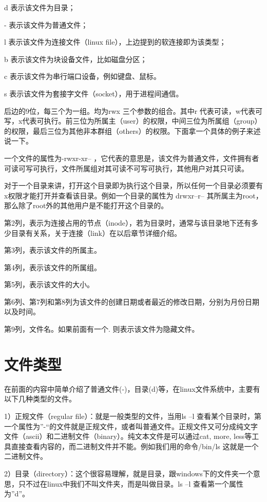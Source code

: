 d 表示该文件为目录；

- 表示该文件为普通文件；

l 表示该文件为连接文件（linux file），上边提到的软连接即为该类型；

b 表示该文件为块设备文件，比如磁盘分区；

c 表示该文件为串行端口设备，例如键盘、鼠标。

s 表示该文件为套接字文件（socket），用于进程间通信。

后边的9位，每三个为一组。均为rwx 三个参数的组合。其中r 代表可读，w代表可写，x代表可执行。前三位为所属主（user）的权限，中间三位为所属组（group）的权限，最后三位为其他非本群组（others）的权限。下面拿一个具体的例子来述说一下。

一个文件的属性为-rwxr-xr-- ，它代表的意思是，该文件为普通文件，文件拥有者可读可写可执行，文件所属组对其可读不可写可执行，其他用户对其只可读。

对于一个目录来讲，打开这个目录即为执行这个目录，所以任何一个目录必须要有x权限才能打开并查看该目录。例如一个目录的属性为 drwxr--r-- 其所属主为root，那么除了root外的其他用户是不能打开这个目录的。

第2列，表示为连接占用的节点（inode），若为目录时，通常与该目录地下还有多少目录有关系，关于连接（link）在以后章节详细介绍。

第3列，表示该文件的所属主。

第4列，表示该文件的所属组。

第5列，表示该文件的大小。

第6列、第7列和第8列为该文件的创建日期或者最近的修改日期，分别为月份日期以及时间。

第9列，文件名。如果前面有一个. 则表示该文件为隐藏文件。


\section{文件类型}
在前面的内容中简单介绍了普通文件(-)，目录(d)等，在linux文件系统中，主要有以下几种类型的文件。

1）正规文件（regular file）：就是一般类型的文件，当用ls –l 查看某个目录时，第一个属性为”-“的文件就是正规文件，或者叫普通文件。正规文件又可分成纯文字文件（ascii）和二进制文件（binary）。纯文本文件是可以通过cat, more, less等工具直接查看内容的，而二进制文件并不能。例如我们用的命令/bin/ls 这就是一个二进制文件。

2）目录（directory）：这个很容易理解，就是目录，跟windows下的文件夹一个意思，只不过在linux中我们不叫文件夹，而是叫做目录。ls –l 查看第一个属性为”d”。

